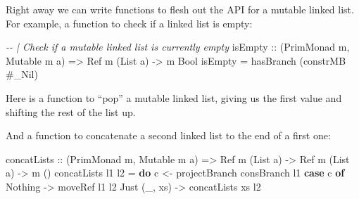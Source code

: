 \documentclass[]{article}
\newenvironment{Shaded}{}{}
\newcommand{\CommentTok}[1]{\textcolor[rgb]{0.38,0.63,0.69}{\textit{#1}}}
\newcommand{\DataTypeTok}[1]{\textcolor[rgb]{0.56,0.13,0.00}{#1}}
\newcommand{\FunctionTok}[1]{\textcolor[rgb]{0.02,0.16,0.49}{#1}}
\newcommand{\KeywordTok}[1]{\textcolor[rgb]{0.00,0.44,0.13}{\textbf{#1}}}
\newcommand{\NormalTok}[1]{#1}
\newcommand{\OperatorTok}[1]{\textcolor[rgb]{0.40,0.40,0.40}{#1}}
\newcommand{\OtherTok}[1]{\textcolor[rgb]{0.00,0.44,0.13}{#1}}
\begin{document}
Right away we can write functions to flesh out the API for a mutable linked
list. For example, a function to check if a linked list is empty:

\begin{Shaded}
\begin{Highlighting}[]
\CommentTok{{-}{-} | Check if a mutable linked list is currently empty}
\NormalTok{isEmpty}
\OtherTok{    ::}\NormalTok{ (}\DataTypeTok{PrimMonad}\NormalTok{ m, }\DataTypeTok{Mutable}\NormalTok{ m a)}
    \OtherTok{=>} \DataTypeTok{Ref}\NormalTok{ m (}\DataTypeTok{List}\NormalTok{ a)}
    \OtherTok{{-}>}\NormalTok{ m }\DataTypeTok{Bool}
\NormalTok{isEmpty }\OtherTok{=}\NormalTok{ hasBranch (constrMB }\OperatorTok{\#}\NormalTok{\_Nil)}
\end{Highlighting}
\end{Shaded}

Here is a function to ``pop'' a mutable linked list, giving us the first value
and shifting the rest of the list up.

\begin{Shaded}
\end{Shaded}

And a function to concatenate a second linked list to the end of a first one:

\begin{Shaded}
\begin{Highlighting}[]
\NormalTok{concatLists}
\OtherTok{    ::}\NormalTok{ (}\DataTypeTok{PrimMonad}\NormalTok{ m, }\DataTypeTok{Mutable}\NormalTok{ m a)}
    \OtherTok{=>} \DataTypeTok{Ref}\NormalTok{ m (}\DataTypeTok{List}\NormalTok{ a)}
    \OtherTok{{-}>} \DataTypeTok{Ref}\NormalTok{ m (}\DataTypeTok{List}\NormalTok{ a)}
    \OtherTok{{-}>}\NormalTok{ m ()}
\NormalTok{concatLists l1 l2 }\OtherTok{=} \KeywordTok{do}
\NormalTok{    c }\OtherTok{<{-}}\NormalTok{ projectBranch consBranch l1}
    \KeywordTok{case}\NormalTok{ c }\KeywordTok{of}
      \DataTypeTok{Nothing}      \OtherTok{{-}>}\NormalTok{ moveRef l1 l2}
      \DataTypeTok{Just}\NormalTok{ (\_, xs) }\OtherTok{{-}>}\NormalTok{ concatLists xs l2}
\end{Highlighting}
\end{Shaded}
\end{document}
